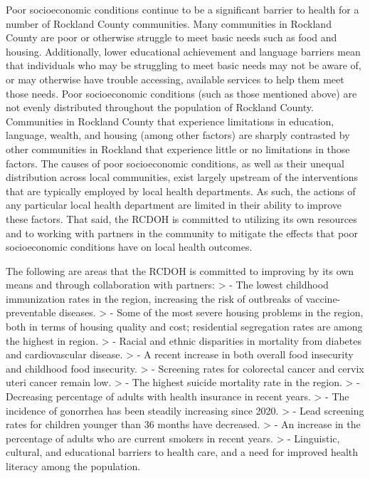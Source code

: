 \documentclass[
  english,
  letterpaper,
]{report}
\begin{document}
Poor socioeconomic conditions continue to be a significant barrier to
health for a number of Rockland County communities. Many communities in
Rockland County are poor or otherwise struggle to meet basic needs such
as food and housing. Additionally, lower educational achievement and
language barriers mean that individuals who may be struggling to meet
basic needs may not be aware of, or may otherwise have trouble
accessing, available services to help them meet those needs. Poor
socioeconomic conditions (such as those mentioned above) are not evenly
distributed throughout the population of Rockland County. Communities in
Rockland County that experience limitations in education, language,
wealth, and housing (among other factors) are sharply contrasted by
other communities in Rockland that experience little or no limitations
in those factors. The causes of poor socioeconomic conditions, as well
as their unequal distribution across local communities, exist largely
upstream of the interventions that are typically employed by local
health departments. As such, the actions of any particular local health
department are limited in their ability to improve these factors. That
said, the RCDOH is committed to utilizing its own resources and to
working with partners in the community to mitigate the effects that poor
socioeconomic conditions have on local health outcomes.

The following are areas that the RCDOH is committed to improving by its
own means and through collaboration with partners: \textgreater{} - The
lowest childhood immunization rates in the region, increasing the risk
of outbreaks of vaccine-preventable diseases. \textgreater{} - Some of
the most severe housing problems in the region, both in terms of housing
quality and cost; residential segregation rates are among the highest in
region. \textgreater{} - Racial and ethnic disparities in mortality from
diabetes and cardiovascular disease. \textgreater{} - A recent increase
in both overall food insecurity and childhood food insecurity.
\textgreater{} - Screening rates for colorectal cancer and cervix uteri
cancer remain low. \textgreater{} - The highest suicide mortality rate
in the region. \textgreater{} - Decreasing percentage of adults with
health insurance in recent years. \textgreater{} - The incidence of
gonorrhea has been steadily increasing since 2020. \textgreater{} - Lead
screening rates for children younger than 36 months have decreased.
\textgreater{} - An increase in the percentage of adults who are current
smokers in recent years. \textgreater{} - Linguistic, cultural, and
educational barriers to health care, and a need for improved health
literacy among the population.
\end{document}
